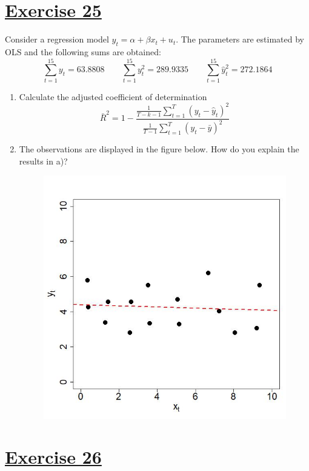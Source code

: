 \documentclass[captions=tableheading, 12pt, headings=small, parskip=half]{scrartcl}
\begin{document}
\section*{\underline{Exercise 25}}

Consider a regression model $y_t = \alpha + \beta x_t + u_t$. The parameters are estimated by OLS and the following sums are obtained:
\[
\sum_{t = 1}^{15}{y_t} = 63.8808 \qquad \sum_{t = 1}^{15}{y_t^2} = 289.9335 \qquad \sum_{t = 1}^{15}{\hat{y}_t^2} = 272.1864
\]
\begin{enumerate}[label = \alph*)]
	\item Calculate the adjusted coefficient of determination
	\[
	\bar{R}^2 = 1 - \frac{\frac{1}{T-k-1} \sum_{t = 1}^T{(y_t - \hat{y}_t)^2}}{\frac{1}{T-1} \sum_{t = 1}^T{(y_t - \bar{y})^2}}
	\]
	\item The observations are displayed in the figure below. How do you explain the results in a)?
	\begin{figure}[H]
		\centering
		\includegraphics[width = 0.5\columnwidth]{Code1/negR.jpeg}
	\end{figure}
\end{enumerate}

\section*{\underline{Exercise 26}}
\end{document}
